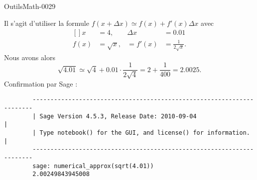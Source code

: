 
\begin{corrige}{OutilsMath-0029}

	Il s'agit d'utiliser la formule $f(x+\Delta x)\simeq f(x)+f'(x)\Delta x$ avec
	\begin{equation}
		\begin{aligned}[]
			x&=4,	&\Delta x&=0.01\\
			f(x)&=\sqrt{x},&=f'(x)&=\frac{1}{ 2\sqrt{x} }.
		\end{aligned}
	\end{equation}
	Nous avons alors
	\begin{equation}
		\sqrt{4.01}\simeq \sqrt{4}+0.01\cdot\frac{1}{ 2\sqrt{4} }=2+\frac{1}{ 400 }=2.0025.
	\end{equation}
	Confirmation par Sage :
	\begin{verbatim}
		----------------------------------------------------------------------
		| Sage Version 4.5.3, Release Date: 2010-09-04                       |
		| Type notebook() for the GUI, and license() for information.        |
		----------------------------------------------------------------------
		sage: numerical_approx(sqrt(4.01))
		2.00249843945008
	\end{verbatim}

\end{corrige}
